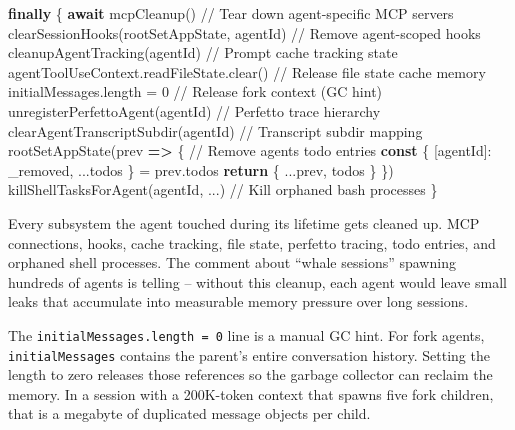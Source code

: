 \documentclass[
  english,
  11pt,
  letterpaper,
]{book}
\newenvironment{Shaded}{\begin{snugshade}}{\end{snugshade}}
\newcommand{\AttributeTok}[1]{\textcolor[rgb]{0.40,0.45,0.13}{#1}}
\newcommand{\CommentTok}[1]{\textcolor[rgb]{0.37,0.37,0.37}{#1}}
\newcommand{\ControlFlowTok}[1]{\textcolor[rgb]{0.00,0.23,0.31}{\textbf{#1}}}
\newcommand{\DecValTok}[1]{\textcolor[rgb]{0.68,0.00,0.00}{#1}}
\newcommand{\FunctionTok}[1]{\textcolor[rgb]{0.28,0.35,0.67}{#1}}
\newcommand{\KeywordTok}[1]{\textcolor[rgb]{0.00,0.23,0.31}{\textbf{#1}}}
\newcommand{\NormalTok}[1]{\textcolor[rgb]{0.00,0.23,0.31}{#1}}
\newcommand{\OperatorTok}[1]{\textcolor[rgb]{0.37,0.37,0.37}{#1}}
\begin{document}
\begin{Shaded}
\begin{Highlighting}[]
\ControlFlowTok{finally}\NormalTok{ \{}
  \ControlFlowTok{await} \FunctionTok{mcpCleanup}\NormalTok{()                              }\CommentTok{// Tear down agent{-}specific MCP servers}
  \FunctionTok{clearSessionHooks}\NormalTok{(rootSetAppState}\OperatorTok{,}\NormalTok{ agentId)      }\CommentTok{// Remove agent{-}scoped hooks}
  \FunctionTok{cleanupAgentTracking}\NormalTok{(agentId)                    }\CommentTok{// Prompt cache tracking state}
\NormalTok{  agentToolUseContext}\OperatorTok{.}\AttributeTok{readFileState}\OperatorTok{.}\FunctionTok{clear}\NormalTok{()         }\CommentTok{// Release file state cache memory}
\NormalTok{  initialMessages}\OperatorTok{.}\AttributeTok{length} \OperatorTok{=} \DecValTok{0}                        \CommentTok{// Release fork context (GC hint)}
  \FunctionTok{unregisterPerfettoAgent}\NormalTok{(agentId)                 }\CommentTok{// Perfetto trace hierarchy}
  \FunctionTok{clearAgentTranscriptSubdir}\NormalTok{(agentId)              }\CommentTok{// Transcript subdir mapping}
  \FunctionTok{rootSetAppState}\NormalTok{(prev }\KeywordTok{=\textgreater{}}\NormalTok{ \{                        }\CommentTok{// Remove agent\textquotesingle{}s todo entries}
    \KeywordTok{const}\NormalTok{ \{ [agentId]}\OperatorTok{:}\NormalTok{ \_removed}\OperatorTok{,} \OperatorTok{...}\NormalTok{todos \} }\OperatorTok{=}\NormalTok{ prev}\OperatorTok{.}\AttributeTok{todos}
    \ControlFlowTok{return}\NormalTok{ \{ }\OperatorTok{...}\NormalTok{prev}\OperatorTok{,}\NormalTok{ todos \}}
\NormalTok{  \})}
  \FunctionTok{killShellTasksForAgent}\NormalTok{(agentId}\OperatorTok{,} \OperatorTok{...}\NormalTok{)             }\CommentTok{// Kill orphaned bash processes}
\NormalTok{\}}
\end{Highlighting}
\end{Shaded}

Every subsystem the agent touched during its lifetime gets cleaned up.
MCP connections, hooks, cache tracking, file state, perfetto tracing,
todo entries, and orphaned shell processes. The comment about ``whale
sessions'' spawning hundreds of agents is telling -- without this
cleanup, each agent would leave small leaks that accumulate into
measurable memory pressure over long sessions.

The \texttt{initialMessages.length\ =\ 0} line is a manual GC hint. For
fork agents, \texttt{initialMessages} contains the parent's entire
conversation history. Setting the length to zero releases those
references so the garbage collector can reclaim the memory. In a session
with a 200K-token context that spawns five fork children, that is a
megabyte of duplicated message objects per child.
\end{document}
